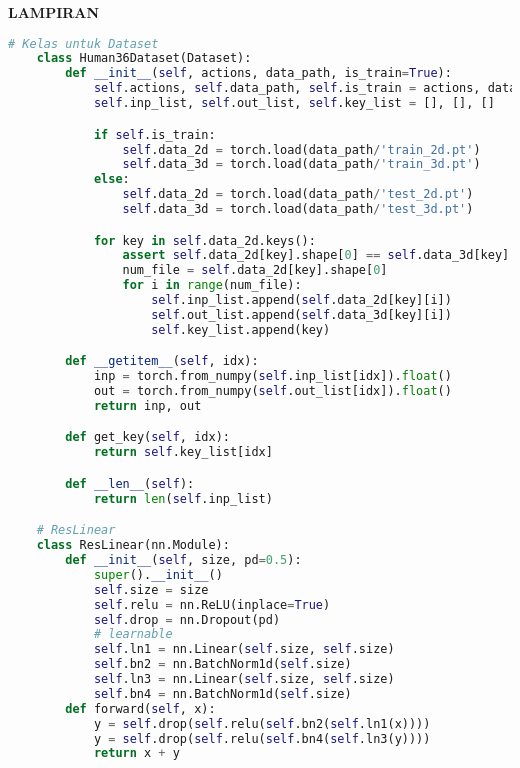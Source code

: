 \newpage %
\singlespacing
\begin{center}
    \begin{large}\textbf{LAMPIRAN}\\\end{large}
\end{center}
\vspace{5mm}


\begin{lstlisting}[language=Python,multicols=2,basicstyle=\tiny,breaklines=true]
    # Kelas untuk Dataset
    class Human36Dataset(Dataset):
        def __init__(self, actions, data_path, is_train=True):
            self.actions, self.data_path, self.is_train = actions, data_path, is_train
            self.inp_list, self.out_list, self.key_list = [], [], []

            if self.is_train:
                self.data_2d = torch.load(data_path/'train_2d.pt')
                self.data_3d = torch.load(data_path/'train_3d.pt')
            else:
                self.data_2d = torch.load(data_path/'test_2d.pt')
                self.data_3d = torch.load(data_path/'test_3d.pt')

            for key in self.data_2d.keys():
                assert self.data_2d[key].shape[0] == self.data_3d[key].shape[0]
                num_file = self.data_2d[key].shape[0]
                for i in range(num_file):
                    self.inp_list.append(self.data_2d[key][i])
                    self.out_list.append(self.data_3d[key][i])
                    self.key_list.append(key)

        def __getitem__(self, idx):
            inp = torch.from_numpy(self.inp_list[idx]).float()
            out = torch.from_numpy(self.out_list[idx]).float()
            return inp, out

        def get_key(self, idx):
            return self.key_list[idx]

        def __len__(self):
            return len(self.inp_list)

    # ResLinear
    class ResLinear(nn.Module):
        def __init__(self, size, pd=0.5):
            super().__init__()
            self.size = size
            self.relu = nn.ReLU(inplace=True)
            self.drop = nn.Dropout(pd)
            # learnable
            self.ln1 = nn.Linear(self.size, self.size)
            self.bn2 = nn.BatchNorm1d(self.size)
            self.ln3 = nn.Linear(self.size, self.size)
            self.bn4 = nn.BatchNorm1d(self.size)
        def forward(self, x):
            y = self.drop(self.relu(self.bn2(self.ln1(x))))
            y = self.drop(self.relu(self.bn4(self.ln3(y))))
            return x + y


\end{lstlisting}
